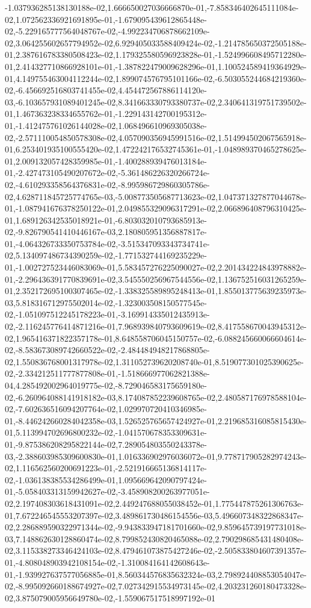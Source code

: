 -1.037936285138130188e-02,1.666650027036666870e-01,-7.858346402645111084e-02,1.072562336921691895e-01,-1.679095439612865448e-02,-5.229165777564048767e-02,-4.992234706878662109e-02,3.064255602657794952e-02,6.929405033588409424e-02,-1.214785650372505188e-01,2.387616783380508423e-02,1.179325580596923828e-01,-1.524996608495712280e-01,2.414327710866928101e-01,-1.387822479009628296e-01,1.100524589419364929e-01,4.149755463004112244e-02,1.899074576795101166e-02,-6.503055244684219360e-02,-6.456692516803741455e-02,4.454472567886114120e-03,-6.103657931089401245e-02,8.341663330793380737e-02,2.340641319751739502e-01,1.467363238334655762e-01,-1.229143142700195312e-01,-1.412475761026144028e-02,1.068496610969305038e-02,-2.571110054850578308e-02,4.057090356945991516e-02,1.514994502067565918e-01,6.253401935100555420e-02,1.472242176532745361e-01,-1.048989370465278625e-01,2.009132057428359985e-01,-1.400288939476013184e-01,-2.427473105490207672e-02,-5.361486226320266724e-02,-4.610293358564376831e-02,-8.995986729860305786e-02,4.628711845725774765e-03,-5.008773505687713623e-02,1.047371327877044678e-01,-1.087941676378250122e-01,2.049855329096317291e-02,2.066896408796310425e-01,1.689126342535018921e-01,-6.803032010793685913e-02,-9.826790541410446167e-03,2.180805951356887817e-01,-4.064326733350753784e-02,-3.515347093343734741e-02,5.134097486734390259e-02,-1.771532744169235229e-01,-1.002727523446083069e-01,5.583457276225090027e-02,2.201434224843978882e-01,-2.296436391770839691e-02,3.545550256967544556e-02,1.136752516031265259e-01,2.352172695100307465e-02,-1.338325589895248413e-01,1.855013775639235973e-03,5.818316712975502014e-02,-1.323003508150577545e-02,-1.051097512245178223e-01,-3.169914335012435913e-02,-2.116245776414871216e-01,7.968939840793609619e-02,8.417558670043945312e-02,1.965416371822357178e-01,8.648558706045150757e-02,-6.088245660066604614e-02,-8.583673089742660522e-02,-2.484484948217868805e-02,1.550836768001317978e-02,1.311052739620208740e-01,8.519077301025390625e-02,-2.334212511777877808e-01,-1.518666977062821388e-04,4.285492002964019775e-02,-8.729046583175659180e-02,-6.260964088141918182e-03,8.174087852239608765e-02,2.480587176978588104e-02,-7.602636516094207764e-02,1.029970720410346985e-01,-8.446242660284042358e-03,1.526525765657424927e-01,2.219685316085815430e-01,5.113994702696800232e-02,-1.041570678353309631e-01,-9.875386208295822144e-02,7.289054803550243378e-03,-2.388603985309600830e-01,1.016336902976036072e-01,9.778717905282974243e-02,1.116562560200691223e-01,-2.521916665136814117e-02,-1.036138385534286499e-01,1.095669642090797424e-01,-5.058403313159942627e-02,-3.458908200263977051e-02,2.197408303618431091e-02,2.449247688055038452e-01,1.775447875261306763e-01,7.672246545553207397e-02,3.489861730486154556e-03,5.496607348322868347e-02,2.286889590322971344e-02,-9.943833947181701660e-02,9.859645739197731018e-03,7.148862630128860474e-02,8.799852430820465088e-02,2.790298685431480408e-02,3.115338273346424103e-02,8.479461073875427246e-02,-2.505833804607391357e-01,-4.808048903942108154e-02,-1.310084164142608643e-01,-1.939927637577056885e-01,8.560344576835632324e-03,2.798924408853054047e-02,-8.995092660188674927e-02,7.027342915534973145e-02,4.203231260180473328e-02,3.875079005956649780e-02,-1.559067517518997192e-01
